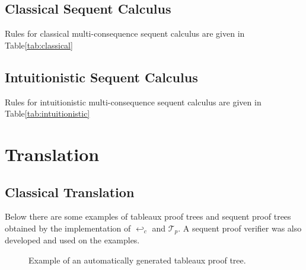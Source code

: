\documentclass[runningheads]{llncs}
\begin{document}
\subsection {Classical Sequent Calculus}

\developmentSequentClassicalDefinition

Rules for classical multi-consequence sequent calculus are given in Table\ref{tab:classical}

\RulesClassicalSequentCalculus
\subsection {Intuitionistic Sequent Calculus}

\developmentSequentIntuitionisticDefinition

Rules for intuitionistic multi-consequence sequent calculus are given in Table\ref{tab:intuitionistic}


\RulesIntuitionisticSequentCalculus


\section{Translation}

\nodeTranslationFunction

\uselessTheorem

\subsection{Classical Translation}



\localTranslationValidityTheorem
    


\TranslationClassical

\TranslationClassicalProof



Below there are some examples of tableaux proof trees and sequent proof trees obtained by the 
implementation of $\hookleftarrow_c$ and $\mathcal{T}_p$. A 
sequent proof verifier was also developed and used on the examples.


\begin{figure}

    {\fontsize{1}{1}\selectfont
        \ocmalImageII

\caption{Example of an automatically generated tableaux proof tree.}
\label{fig:destructive_tableaux}
    }
\end{figure}
\end{document}
